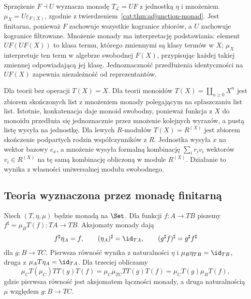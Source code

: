 Sprzężenie $F\dashv U$ wyznacza monadę $T_{\mathcal L}=UF$ z jednostką $\eta$ i mnożeniem $\mu_X=U\varepsilon_{F(X)}$, zgodnie z twierdzeniem~\ref{cat:thm:adjunction-monad}. Jest finitarna, ponieważ $F$ zachowuje wszystkie kogranice zbiorów, a $U$ zachowuje kogranice filtrowane. Mnożenie monady ma interpretację podstawiania: element $UF(UF(X))$ to klasa termu, którego zmiennymi są klasy termów w $X$; $\mu_X$ interpretuje ten term w algebrze swobodnej $F(X)$, przypisując każdej takiej zmiennej odpowiadającą jej klasę. Jednoznaczność przedłużenia identyczności na $UF(X)$ zapewnia niezależność od reprezentantów.

\begin{przyklad}\label{cat:ex:lawvere-finitary-monads}
Dla teorii bez operacji $T(X)=X$. Dla teorii monoidów $T(X)=\coprod_{n\geq0}X^n$ jest zbiorem skończonych list z mnożeniem monady polegającym na spłaszczaniu list list. Istotnie, konkatenacja daje monoid swobodny, ponieważ funkcja z $X$ do monoidu przedłuża się jednoznacznie przez mnożenie kolejnych wyrazów, a pustą listę wysyła na jednostkę. Dla lewych $R$-modułów $T(X)=R^{(X)}$ jest zbiorem skończenie podpartych rodzin współczynników z $R$. Jednostka wysyła $x$ na wektor bazowy $e_x$, a mnożenie wysyła formalną kombinację $\sum_i r_i v_i$ wektorów $v_i\in R^{(X)}$ na tę samą kombinację obliczoną w module $R^{(X)}$. Działanie to wynika z własności uniwersalnej modułu swobodnego.
\end{przyklad}

\subsection{Teoria wyznaczona przez monadę finitarną}

Niech $(T,\eta,\mu)$ będzie monadą na $\Set$. Dla funkcji $f:A\to TB$ piszemy $f^\sharp=\mu_B T(f):TA\to TB$. Aksjomaty monady dają
\begin{equation}\label{cat:eq:lawvere-kleisli}
 f^\sharp\eta_A=f,\qquad
 (\eta_A)^\sharp=\id_{TA},\qquad
 (g^\sharp f)^\sharp=g^\sharp f^\sharp
\end{equation}
dla $g:B\to TC$. Pierwsza równość wynika z naturalności $\eta$ i $\mu_B\eta_{TB}=\id_{TB}$, druga z $\mu_A T\eta_A=\id_{TA}$. Dla trzeciej obliczamy
\[
 \mu_C T(\mu_C)TT(g)T(f)
 =\mu_C\mu_{TC}TT(g)T(f)
 =\mu_C T(g)\mu_B T(f),
\]
gdzie pierwsza równość jest aksjomatem łączności monady, a druga naturalnością $\mu$ względem $g:B\to TC$.

